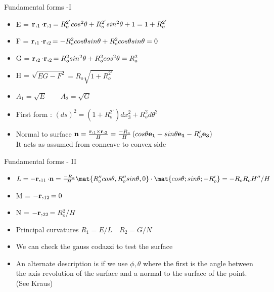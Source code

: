 	\begin{frame}{Fundamental forms -I}
		\begin{itemize}
			\item E = $\mathbf{r},_1 \cdot \mathbf{r},_1 
			= R_o^{2'}cos^2\theta+ R_o^{2'}sin^2\theta + 1 = 1 + R_o^{2'}$
			\item F =  $\mathbf{r},_1 \cdot \mathbf{r},_2 =  -R_o^2cos\theta sin\theta + R_o^2cos\theta sin\theta = 0$
			\item  G =   $ \mathbf{r},_2 \cdot \mathbf{r},_2 = R_o^2sin^2\theta+ R_o^2cos^2\theta  =  R_o^2$
			\item H = $\sqrt{EG-F^2} = R_o\sqrt{1+R_o^{2'}}$
			\item $A_1 = \sqrt{E} \qquad A_2 = \sqrt{G}$
			\item First form : $(ds)^2 = \left(1 +   R_o^{2'}\right)dx_3^2 + R_o^2 d\theta^2$
			\item Normal to surface $\mathbf{n} = \frac{\mathbf{r},_1\times \mathbf{r},_2}{H} = \frac{-R_o}{H} \left(cos \theta \mathbf{e_1}
			+ sin \theta \mathbf{e_1} -  R_o' \mathbf{e_3}\right)$ 
			\\ It acts as assumed from conncave to convex side
		\end{itemize}
	
	\end{frame}


	\begin{frame}{Fundamental forms - II}
		\begin{itemize}
			\item $L = - \ve{r},_{11}\cdot \ve{n} = \frac{-R_o}{H} \mat{R_o''cos\theta , R_o''sin\theta,0} \cdot \mat{cos \theta; sin \theta; -R_o'} = -R_oR_oH''/H$
			\item M = $-\mathbf{r},_{12} = 0 $
			\item N = $-\mathbf{r},_{22} =  R_o^2/H$
			\item Principal curvatures $R_1 = E/L \quad R_2 = G/N$
			\item We can check the gauss codazzi to test the surface
			\item An alternate description is if we use $\phi,\theta$ where the first is the angle between the axis revolution of the surface and a normal to the surface of the point. (See Kraus)
		\end{itemize}
	\end{frame}

